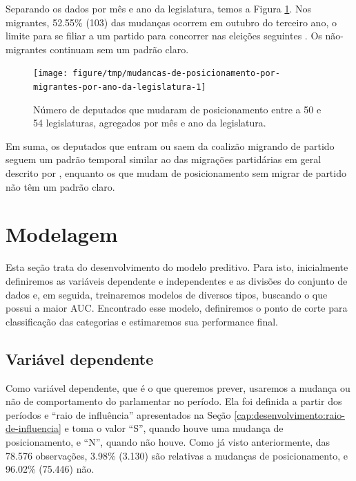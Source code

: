\documentclass[a4paper,titlepage]{ppgi}\usepackage[]{graphicx}\usepackage[]{color}
\newenvironment{knitrout}{}{} %
\begin{document}
Separando os dados por mês e ano da legislatura, temos a Figura
\ref{fig:mudancas-de-posicionamento-por-migrantes-por-ano-da-legislatura}. Nos
migrantes,
52.55\%
(103) das mudanças ocorrem
em outubro do terceiro ano, o limite para se filiar a um partido para concorrer
nas eleições seguintes \cite{Lei9504/1997}. Os não-migrantes continuam sem um
padrão claro.

\begin{knitrout}
\color{fgcolor}\begin{figure}
\texttt{[image: figure/tmp/mudancas-de-posicionamento-por-migrantes-por-ano-da-legislatura-1]} \caption[Número de deputados que mudaram de posicionamento entre a 50\textordfeminine{} e 54\textordfeminine{} legislaturas, agregados por mês e ano da legislatura]{Número de deputados que mudaram de posicionamento entre a 50\textordfeminine{} e 54\textordfeminine{} legislaturas, agregados por mês e ano da legislatura.}\label{fig:mudancas-de-posicionamento-por-migrantes-por-ano-da-legislatura}
\end{figure}


\end{knitrout}

Em suma, os deputados que entram ou saem da coalizão migrando de partido
seguem um padrão temporal similar ao das migrações partidárias em geral
descrito por , enquanto os que mudam de posicionamento
sem migrar de partido não têm um padrão claro.

\section{Modelagem}
\label{cap:desenvolvimento:modelagem}



Esta seção trata do desenvolvimento do modelo preditivo. Para isto,
inicialmente definiremos as variáveis dependente e independentes e as divisões
do conjunto de dados e, em seguida, treinaremos modelos de diversos tipos,
buscando o que possui a maior \gls{AUC}. Encontrado esse modelo, definiremos o
ponto de corte para classificação das categorias e estimaremos sua performance
final.

\subsection{Variável dependente}

Como variável dependente, que é o que queremos prever, usaremos a mudança ou
não de comportamento do parlamentar no período. Ela foi definida a partir dos
períodos e ``raio de influência'' apresentados na Seção
\ref{cap:desenvolvimento:raio-de-influencia} e toma o valor ``S'', quando
houve uma mudança de posicionamento, e ``N'', quando não houve. Como já visto
anteriormente, das 78.576 observações,
3.98\% (3.130) são relativas a mudanças de posicionamento, e
96.02\% (75.446) não.
\end{document}
